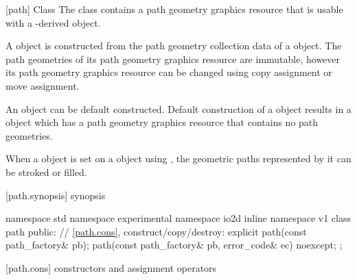  [path] {Class }
\pnum
{}
The class  contains a path geometry graphics resource that is usable with a -derived object.

\pnum
A  object is constructed from the path geometry collection data of a  object. The path geometries of its path geometry graphics resource are immutable, however its path geometry graphics resource can be changed using copy assignment or move assignment.

\pnum
An  object can be default constructed. Default construction of a  object results in a  object which has a path geometry graphics resource that contains no path geometries.

\pnum
When a  object is set on a  object using 
, the geometric paths represented by it can be 
stroked or filled.

%
 [path.synopsis] { synopsis}

\begin{codeblock}
namespace std { namespace experimental { namespace io2d { inline namespace v1 {
  class path {
    public:
    // \ref{path.cons}, construct/copy/destroy:
    explicit path(const path_factory& pb);
    path(const path_factory& pb, error_code& ec) noexcept;
  };
} } } }
\end{codeblock}

 [path.cons] { constructors and assignment operators}

